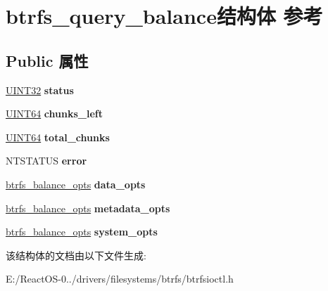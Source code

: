 \hypertarget{structbtrfs__query__balance}{}\section{btrfs\+\_\+query\+\_\+balance结构体 参考}
\label{structbtrfs__query__balance}
\subsection*{Public 属性}
\begin{DoxyCompactItemize}
\item 
\mbox{\label{structbtrfs__query__balance_af3e91922938a13a75dc0170c8672f34c}} 
\hyperlink{_processor_bind_8h_ae1e6edbbc26d6fbc71a90190d0266018}{U\+I\+N\+T32} {\bfseries status}
\item 
\mbox{\label{structbtrfs__query__balance_ade06cc0bef839ff53ebb9a6f911e3659}} 
\hyperlink{_processor_bind_8h_a57be03562867144161c1bfee95ca8f7c}{U\+I\+N\+T64} {\bfseries chunks\+\_\+left}
\item 
\mbox{\label{structbtrfs__query__balance_abd736e012a5672c59db96d93173ac5f2}} 
\hyperlink{_processor_bind_8h_a57be03562867144161c1bfee95ca8f7c}{U\+I\+N\+T64} {\bfseries total\+\_\+chunks}
\item 
\mbox{\label{structbtrfs__query__balance_a06ee2c9f419f22c4c62d3d9aeefe63d8}} 
N\+T\+S\+T\+A\+T\+US {\bfseries error}
\item 
\mbox{\label{structbtrfs__query__balance_a0d28fbafbc08b2ca5d1696adebde7fd8}} 
\hyperlink{structbtrfs__balance__opts}{btrfs\+\_\+balance\+\_\+opts} {\bfseries data\+\_\+opts}
\item 
\mbox{\label{structbtrfs__query__balance_a46e1bb89bc071e808670c10d86f3cb4e}} 
\hyperlink{structbtrfs__balance__opts}{btrfs\+\_\+balance\+\_\+opts} {\bfseries metadata\+\_\+opts}
\item 
\mbox{\label{structbtrfs__query__balance_af111ec131ce7fffd97be9529d7817f47}} 
\hyperlink{structbtrfs__balance__opts}{btrfs\+\_\+balance\+\_\+opts} {\bfseries system\+\_\+opts}
\end{DoxyCompactItemize}


该结构体的文档由以下文件生成\+:\begin{DoxyCompactItemize}
\item 
E\+:/\+React\+O\+S-\/0../drivers/filesystems/btrfs/btrfsioctl.\+h\end{DoxyCompactItemize}
